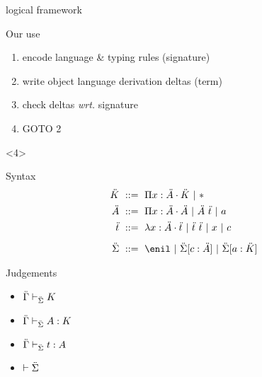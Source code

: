 \documentclass[ignorenonframetext,red]{beamer}
\begin{document}
\begin{frame}{ logical framework }
\begin{onlyenv}
    \begin{block}{Our use}
      \begin{enumerate}
      \item encode language \& typing rules (signature)
      \item write object language derivation deltas (term)
      \item check deltas \emph{wrt.} signature
      \item GOTO 2
      \end{enumerate}
    \end{block}
  \end{onlyenv}
  \begin{onlyenv}<4>
    \inXLF
    \begin{block}{Syntax}
      \begin{align*}
        \mk &\gequal { \prd\mv\mf\mk \gor \type } \\
        \mf &\gequal { \prd\mv\mf\mf \gor \app\mf\mo \gor \mcf } \\
        \mo &\gequal { \lam\mv\mf\mo \gor \app\mo\mo \gor \mv \gor \mco } \\[0.5em]
        \msi &\gequal { \enil \gor \ebinddecl\msi\mco\mf \gor
          \ebinddecl\msi\mcf\mk }
      \end{align*}
    \end{block}
    \begin{block}{Judgements}
      \begin{itemize}
      \item ${\ddot{\Gamma}}\vdash_{\ddot{\Sigma}}{K}$
      \item ${\ddot{\Gamma}}\vdash_{\ddot{\Sigma}}{{A}:{K}}$
      \item ${\ddot{\Gamma}}\vdash_{\ddot{\Sigma}}{{t}:{A}}$
      \item $\vdash \ddot{\Sigma}$
      \end{itemize}
    \end{block}
  \end{onlyenv}
\end{frame}
\end{document}

